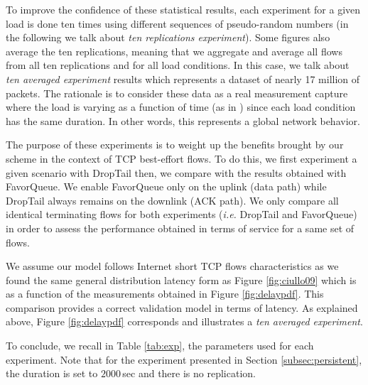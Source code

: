 \documentclass{elsart}
\begin{document}
To improve the confidence of these statistical results, each experiment for a given load is done ten times using different sequences of pseudo-random numbers (in the following we talk about \textit{ten replications experiment}). Some figures also average the ten replications, meaning that we aggregate and average all flows from all ten replications and for all load conditions.
In this case, we talk about \textit{ten averaged experiment} results which represents a dataset of nearly 17 million of packets. The rationale is to consider these data as a real measurement capture where the load is varying as a function of time (as in \cite{ciullo09}) since each load condition has the same duration. In other words, this represents a global network behavior. 

The purpose of these experiments is to weight up the benefits brought by our scheme in the context of TCP best-effort flows. To do this, we first experiment a given scenario with DropTail then, we compare with the results obtained with FavorQueue. We enable FavorQueue only on the uplink (data path) while DropTail always remains on the downlink (ACK path).
We only compare all identical terminating flows for both experiments (\textit{i.e.} DropTail and FavorQueue) in order to assess the performance obtained in terms of service for a same set of flows.

We assume our model follows Internet short TCP flows characteristics as we found the same general distribution latency form as Figure \ref{fig:ciullo09} which is as a function of the measurements obtained in Figure \ref{fig:delaypdf}. This comparison provides a correct validation model in terms of latency. As explained above, Figure \ref{fig:delaypdf} corresponds and illustrates a \textit{ten averaged experiment}. 

To conclude, we recall in Table \ref{tab:exp}, the parameters used for each experiment. Note that for the experiment presented in Section \ref{subsec:persistent}, the duration is set to $2000$\,sec and there is no replication.
\end{document}
